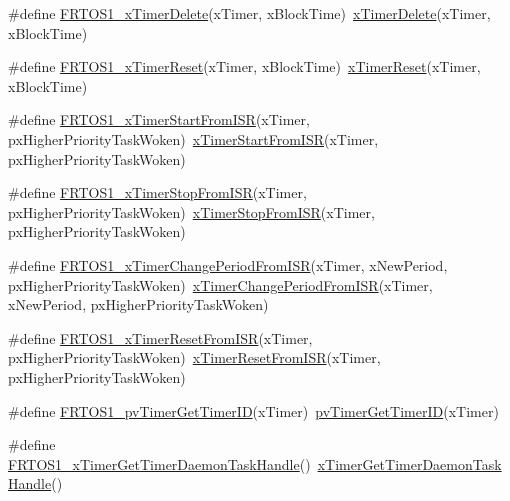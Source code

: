 \begin{DoxyCompactItemize}
\item 
\#define \hyperlink{group___f_r_t_o_s1__module_ga4d68b3fec5c82215774a6243b14feace}{F\+R\+T\+O\+S1\+\_\+x\+Timer\+Delete}(x\+Timer,  x\+Block\+Time)~\hyperlink{timers_8h_a8c8e21f05ebe92e15449addc5d269d10}{x\+Timer\+Delete}(x\+Timer, x\+Block\+Time)
\item 
\#define \hyperlink{group___f_r_t_o_s1__module_ga64fb9b2acbe89ba94210906b511f85a7}{F\+R\+T\+O\+S1\+\_\+x\+Timer\+Reset}(x\+Timer,  x\+Block\+Time)~\hyperlink{timers_8h_a8081b4541b752908dc55df2693e53287}{x\+Timer\+Reset}(x\+Timer, x\+Block\+Time)
\item 
\#define \hyperlink{group___f_r_t_o_s1__module_ga6b25b13dac5c52cb4b3446715b0de4b5}{F\+R\+T\+O\+S1\+\_\+x\+Timer\+Start\+From\+I\+SR}(x\+Timer,  px\+Higher\+Priority\+Task\+Woken)~\hyperlink{timers_8h_adab5809f9679e44a343b8dbb8fb7c67f}{x\+Timer\+Start\+From\+I\+SR}(x\+Timer, px\+Higher\+Priority\+Task\+Woken)
\item 
\#define \hyperlink{group___f_r_t_o_s1__module_gaa0fc454ad8976c63fae1e5e73e835029}{F\+R\+T\+O\+S1\+\_\+x\+Timer\+Stop\+From\+I\+SR}(x\+Timer,  px\+Higher\+Priority\+Task\+Woken)~\hyperlink{timers_8h_aef0f53e7ecfaa881621da83d61072db7}{x\+Timer\+Stop\+From\+I\+SR}(x\+Timer, px\+Higher\+Priority\+Task\+Woken)
\item 
\#define \hyperlink{group___f_r_t_o_s1__module_ga3774e7903c882b320eba3dd4abb349db}{F\+R\+T\+O\+S1\+\_\+x\+Timer\+Change\+Period\+From\+I\+SR}(x\+Timer,  x\+New\+Period,  px\+Higher\+Priority\+Task\+Woken)~\hyperlink{timers_8h_a6d89ca6afb6e692e98932b5038c9e14a}{x\+Timer\+Change\+Period\+From\+I\+SR}(x\+Timer, x\+New\+Period, px\+Higher\+Priority\+Task\+Woken)
\item 
\#define \hyperlink{group___f_r_t_o_s1__module_ga42fcc986fc89e580b9ceb148b0d8bbe9}{F\+R\+T\+O\+S1\+\_\+x\+Timer\+Reset\+From\+I\+SR}(x\+Timer,  px\+Higher\+Priority\+Task\+Woken)~\hyperlink{timers_8h_a448138d0cebf76044f107ca56c842230}{x\+Timer\+Reset\+From\+I\+SR}(x\+Timer, px\+Higher\+Priority\+Task\+Woken)
\item 
\#define \hyperlink{group___f_r_t_o_s1__module_gac7adcb919368fb838c08db51a4527a92}{F\+R\+T\+O\+S1\+\_\+pv\+Timer\+Get\+Timer\+ID}(x\+Timer)~\hyperlink{timers_8h_ae20907a90360107d72283eb9099685ad}{pv\+Timer\+Get\+Timer\+ID}(x\+Timer)
\item 
\#define \hyperlink{group___f_r_t_o_s1__module_ga7ed8fb2b7f99b344ac287c969c50194c}{F\+R\+T\+O\+S1\+\_\+x\+Timer\+Get\+Timer\+Daemon\+Task\+Handle}()~\hyperlink{timers_8h_ad2a0d15a1e213493bd898e748d9f7555}{x\+Timer\+Get\+Timer\+Daemon\+Task\+Handle}()

\end{DoxyCompactItemize}
